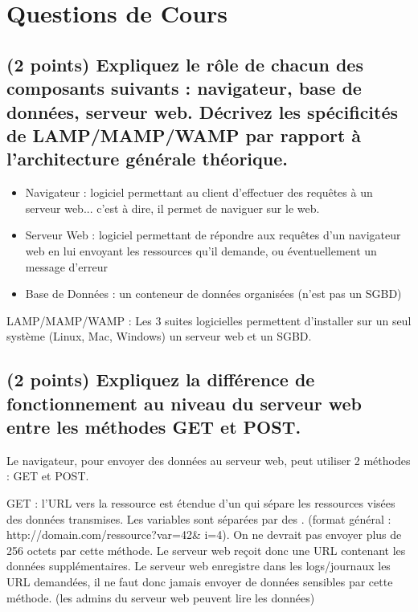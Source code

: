 \documentclass[11pt,a4paper]{article}
\begin{document}
\MakeExamTitle                   %


\section{Questions de Cours}

\subsection{(2 points) Expliquez le rôle de chacun des composants suivants : navigateur, base de données, serveur web. Décrivez les spécificités de LAMP/MAMP/WAMP par rapport à l'architecture générale théorique.}

\bigskip

\begin{itemize}
\item Navigateur : logiciel permettant au client d'effectuer des requêtes à un serveur web... c'est à dire, il permet de naviguer sur le web.
\item Serveur Web : logiciel permettant de répondre aux requêtes d'un navigateur web en lui envoyant les ressources qu'il demande, ou éventuellement un message d'erreur
\item Base de Données : un conteneur de données organisées (n'est pas un SGBD)
\end{itemize}

LAMP/MAMP/WAMP : Les 3 suites logicielles permettent d'installer sur un seul système (Linux, Mac, Windows) un serveur web et un SGBD.

\bigskip

\subsection{(2 points) Expliquez la différence de fonctionnement au niveau du serveur web entre les méthodes GET et POST.}

\bigskip

Le navigateur, pour envoyer des données au serveur web, peut utiliser 2 méthodes : GET et POST.

GET : l'URL vers la ressource est étendue d'un  qui sépare les ressources visées des données transmises.
Les variables sont séparées par des \TTBF{\&}. (format général : http://domain.com/ressource?var=42\& i=4).
On ne devrait pas envoyer plus de 256 octets par cette méthode.
Le serveur web reçoit donc une URL contenant les données supplémentaires.
Le serveur web enregistre dans les logs/journaux les URL demandées, il ne faut donc jamais envoyer de données sensibles par cette méthode. (les admins du serveur web peuvent lire les données)
\end{document}
